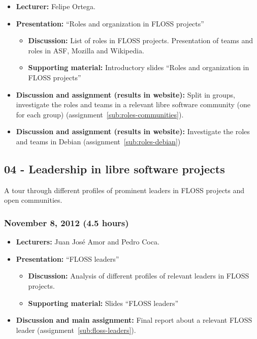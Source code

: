 \documentclass[a4paper]{article}
\begin{document}
\begin{itemize}
\item \textbf{Lecturer:} Felipe Ortega.
\item \textbf{Presentation:} ``Roles and organization in FLOSS projects''
  \begin{itemize}
  \item \textbf{Discussion:} List of roles in FLOSS projects. Presentation of teams and roles in ASF, Mozilla and Wikipedia.
  \item \textbf{Supporting material:} Introductory slides ``Roles and organization in FLOSS projects''
  \end{itemize}
\item \textbf{Discussion and assignment (results in website):} Split in groups, investigate the roles and teams in a relevant
libre software community (one for each group) (assignment~\ref{sub:roles-communities}).
\item \textbf{Discussion and assignment (results in website):} Investigate the roles and teams in Debian (assignment~\ref{sub:roles-debian})
\end{itemize}

\subsection{04 - Leadership in libre software projects}

A tour through different profiles of prominent leaders in FLOSS projects and open communities.

\subsubsection{November 8, 2012 (4.5 hours)}

\begin{itemize}
\item \textbf{Lecturers:} Juan José Amor and Pedro Coca.
\item \textbf{Presentation:} ``FLOSS leaders''
  \begin{itemize}
  \item \textbf{Discussion:} Analysis of different profiles of relevant leaders in FLOSS projects.
  \item \textbf{Supporting material:} Slides ``FLOSS leaders''
  \end{itemize}
\item \textbf{Discussion and main assignment:} Final report about a relevant FLOSS leader (assignment~\ref{sub:floss-leaders}).

\end{itemize}
\end{document}

